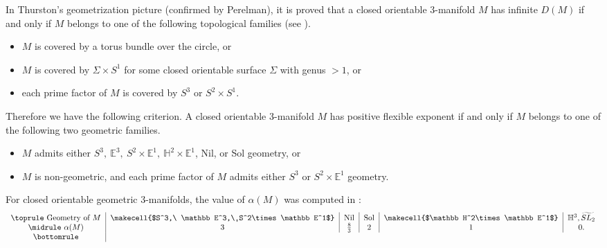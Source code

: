 \documentclass{amsart}
\newcommand{\R}{\mathbb{R}}
\begin{document}
In Thurston's geometrization picture (confirmed by Perelman), 
 it is proved that  a closed orientable 3-manifold $M$ has infinite $D(M)$ if and only if $M$ belongs to one of the following topological families (see \cite[Corollary 4.3]{Wang}).
\begin{itemize}
    \item [(i)] $M$ is covered by a torus bundle over the circle, or

    \item [(ii)] $M$ is covered by $\Sigma\times S^1$ for some closed orientable surface $\Sigma$ with genus $>1$, or

    \item [(iii)] each prime factor of $M$ is covered by $S^3$ or $S^2\times S^1$.
\end{itemize}


 
Therefore we have the following criterion.
    A closed orientable 3-manifold $M$ has positive flexible exponent if and only if $M$ belongs to one of the following two geometric families.
    \begin{itemize}
        \item $M$ admits either $S^3,\ \mathbb E^3,\ S^2\times \mathbb E^1,\ \mathbb H^2\times \mathbb E^1$, Nil, or Sol geometry, or
        \item $M$ is non-geometric, and each prime factor of $M$ admits either $S^3$ or $S^2\times \mathbb E^1$ geometry.
    \end{itemize}


For closed orientable geometric 3-manifolds, the value of $\alpha(M)$ was computed in \cite{DLWWW}:
 \[
      \begin{tabular}{c|c|c|c|c|c}
            \toprule
                  Geometry of $M$  & \makecell{$S^3,\ \mathbb E^3,\ S^2\times \mathbb E^1$} & Nil  & Sol  & \makecell{$\mathbb H^2\times\mathbb E^1$} & $\mathbb H^3, \widetilde {SL_2}$ \\ \midrule
                $\alpha(M)$ & $3$ & $\frac 83$ & $2$  & $1$ & $0.$\\
            \bottomrule
    \end{tabular}
    \]


\end{document}
